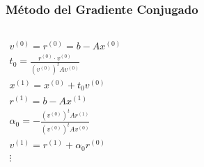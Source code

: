 \documentclass[10pt]{beamer}
\begin{document}
\begin{frame}
  \frametitle{M\'etodo del Gradiente Conjugado}
  \small
  \begin{columns}
    $$
    \begin{array}{l}
    v^{(0)} = r^{(0)} = b - Ax^{(0)}\\[5pt]
    t_0 = \displaystyle\frac{r^{(0)}\cdot v^{(0)}}{(v^{(0)})^tAv^{(0)}}\\[10pt]
    x^{(1)} = x^{(0)} + t_0v^{(0)}\\[5pt]
    r^{(1)} = b -Ax^{(1)}\\[5pt]
    \alpha_0 = -\displaystyle\frac{(v^{(0)})^tAr^{(1)}}{(v^{(0)})^tAv^{(0)}}\\[10pt]
    v^{(1)}=r^{(1)}+\alpha_0r^{(0)}\\[5pt]
    \vdots
    \end{array}
    $$
  \end{columns}
\end{frame}
\end{document}
